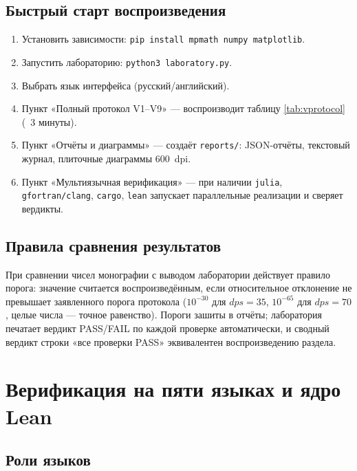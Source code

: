 \subsection{Быстрый старт воспроизведения}

\begin{enumerate}[leftmargin=2em, itemsep=0.15em]
\item Установить зависимости: \texttt{pip install mpmath numpy
  matplotlib}.
\item Запустить лабораторию: \texttt{python3 laboratory.py}.
\item Выбрать язык интерфейса (русский/английский).
\item Пункт «Полный протокол V1--V9» --- воспроизводит таблицу
  \ref{tab:vprotocol} (~3 минуты).
\item Пункт «Отчёты и диаграммы» --- создаёт \texttt{reports/}:
  JSON-отчёты, текстовый журнал, плиточные диаграммы $600$~dpi.
\item Пункт «Мультиязычная верификация» --- при наличии
  \texttt{julia}, \texttt{gfortran/clang}, \texttt{cargo},
  \texttt{lean} запускает параллельные реализации и сверяет вердикты.
\end{enumerate}

\subsection{Правила сравнения результатов}

При сравнении чисел монографии с выводом лаборатории действует
правило порога: значение считается воспроизведённым, если
относительное отклонение не превышает заявленного порога протокола
($10^{-30}$ для $dps=35$, $10^{-65}$ для $dps=70$, целые числа ---
точное равенство). Пороги зашиты в отчёты; лаборатория печатает
вердикт PASS/FAIL по каждой проверке автоматически, и сводный вердикт
строки «все проверки PASS» эквивалентен воспроизведению раздела.

\section{Верификация на пяти языках и ядро Lean}\label{sec:multilang}

\subsection{Роли языков}

